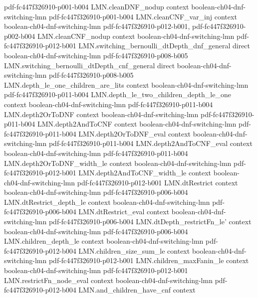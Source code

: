 \begin{theorem}
  {pdf-fc447f326910-p001-b004}
\proofstep
  {LMN.cleanDNF_nodup}
  {context}
  {boolean-ch04-dnf-switching-lmn}
  {pdf-fc447f326910-p001-b004}
\proofstep
  {LMN.cleanCNF_var_inj}
  {context}
  {boolean-ch04-dnf-switching-lmn}
  {pdf-fc447f326910-p012-b001,
    pdf-fc447f326910-p002-b004}
\proofstep
  {LMN.cleanCNF_nodup}
  {context}
  {boolean-ch04-dnf-switching-lmn}
  {pdf-fc447f326910-p012-b001}
\proofstep
  {LMN.switching_bernoulli_dtDepth_dnf_general}
  {direct}
  {boolean-ch04-dnf-switching-lmn}
  {pdf-fc447f326910-p008-b005}
\proofstep
  {LMN.switching_bernoulli_dtDepth_cnf_general}
  {direct}
  {boolean-ch04-dnf-switching-lmn}
  {pdf-fc447f326910-p008-b005}
\proofstep
  {LMN.depth_le_one_children_are_lits}
  {context}
  {boolean-ch04-dnf-switching-lmn}
  {pdf-fc447f326910-p011-b004}
\proofstep
  {LMN.depth_le_two_children_depth_le_one}
  {context}
  {boolean-ch04-dnf-switching-lmn}
  {pdf-fc447f326910-p011-b004}
\proofstep
  {LMN.depth2OrToDNF}
  {context}
  {boolean-ch04-dnf-switching-lmn}
  {pdf-fc447f326910-p011-b004}
\proofstep
  {LMN.depth2AndToCNF}
  {context}
  {boolean-ch04-dnf-switching-lmn}
  {pdf-fc447f326910-p011-b004}
\proofstep
  {LMN.depth2OrToDNF_eval}
  {context}
  {boolean-ch04-dnf-switching-lmn}
  {pdf-fc447f326910-p011-b004}
\proofstep
  {LMN.depth2AndToCNF_eval}
  {context}
  {boolean-ch04-dnf-switching-lmn}
  {pdf-fc447f326910-p011-b004}
\proofstep
  {LMN.depth2OrToDNF_width_le}
  {context}
  {boolean-ch04-dnf-switching-lmn}
  {pdf-fc447f326910-p012-b001}
\proofstep
  {LMN.depth2AndToCNF_width_le}
  {context}
  {boolean-ch04-dnf-switching-lmn}
  {pdf-fc447f326910-p012-b001}
\proofstep
  {LMN.dtRestrict}
  {context}
  {boolean-ch04-dnf-switching-lmn}
  {pdf-fc447f326910-p006-b004}
\proofstep
  {LMN.dtRestrict_depth_le}
  {context}
  {boolean-ch04-dnf-switching-lmn}
  {pdf-fc447f326910-p006-b004}
\proofstep
  {LMN.dtRestrict_eval}
  {context}
  {boolean-ch04-dnf-switching-lmn}
  {pdf-fc447f326910-p006-b004}
\proofstep
  {LMN.dtDepth_restrictFn_le'}
  {context}
  {boolean-ch04-dnf-switching-lmn}
  {pdf-fc447f326910-p006-b004}
\proofstep
  {LMN.children_depth_le}
  {context}
  {boolean-ch04-dnf-switching-lmn}
  {pdf-fc447f326910-p012-b004}
\proofstep
  {LMN.children_size_sum_le}
  {context}
  {boolean-ch04-dnf-switching-lmn}
  {pdf-fc447f326910-p012-b001}
\proofstep
  {LMN.children_maxFanin_le}
  {context}
  {boolean-ch04-dnf-switching-lmn}
  {pdf-fc447f326910-p012-b001}
\proofstep
  {LMN.restrictFn_node_eval}
  {context}
  {boolean-ch04-dnf-switching-lmn}
  {pdf-fc447f326910-p012-b004}
\proofstep
  {LMN.and_children_have_cnf}
  {context}

\end{theorem}
